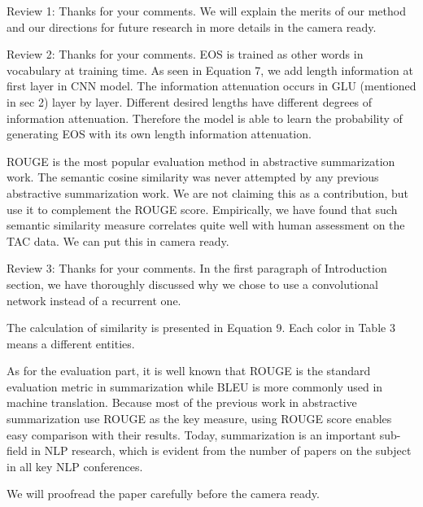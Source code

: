 Review 1:
Thanks for your comments. We will explain the merits of our
method and our directions for future research in more details
in the camera ready.

Review 2:
Thanks for your comments. 
EOS is trained as other words in vocabulary at training time.
As seen in Equation 7, we add length information at first 
layer in CNN model. The information attenuation occurs in GLU
(mentioned in sec 2) layer by layer. Different desired lengths
have different degrees of information attenuation. Therefore the model 
is able to learn the probability of generating 
EOS with its own length information attenuation. 

ROUGE is the most popular evaluation method in abstractive 
summarization work. The semantic cosine similarity was never 
attempted by any previous abstractive summarization work. 
We are not claiming this as a contribution, but use it to complement
the ROUGE score. Empirically, we have found that such semantic
similarity measure correlates quite well with human assessment on 
the TAC data. We can put this in camera ready.

Review 3:
Thanks for your comments. 
In the first paragraph of Introduction section, we have thoroughly
discussed why we chose to use a convolutional network instead of
a recurrent one.

The calculation of similarity is presented in Equation 9. 
Each color in Table 3 means a different entities. 

As for the evaluation part, it is well known that ROUGE is the 
standard evaluation metric in summarization while BLEU is 
more commonly used in machine translation. Because most of the 
previous work in abstractive summarization use ROUGE as the key measure, 
using ROUGE score enables easy comparison with their results. 
Today, summarization is an important sub-field in NLP research,
which is evident from the number of papers on the subject in all
key NLP conferences.

We will proofread the paper carefully before the camera ready.
